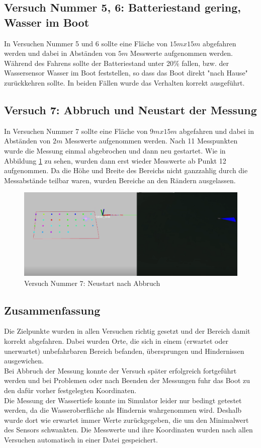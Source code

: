 \documentclass[11pt]{article}
\begin{document}
\subsection{Versuch Nummer 5, 6: Batteriestand gering, Wasser im Boot}
In Versuchen Nummer 5 und 6 sollte eine Fläche von $15mx15m$ abgefahren werden und dabei in Abständen von $5m$ Messwerte aufgenommen werden. Während des Fahrens sollte der Batteriestand unter 20\% fallen, bzw. der Wassersensor Wasser im Boot feststellen, so dass das Boot direkt "nach Hause" zurückkehren sollte. In beiden Fällen wurde das Verhalten korrekt ausgeführt.\\

\subsection{Versuch 7: Abbruch und Neustart der Messung}
In Versuchen Nummer 7 sollte eine Fläche von $9mx15m$ abgefahren und dabei in Abständen von $2m$ Messwerte aufgenommen werden. Nach 11 Messpunkten wurde die Messung einmal abgebrochen und dann neu gestartet. Wie in Abbildung \ref{Versuch7} zu sehen, wurden dann erst wieder Messwerte ab Punkt 12 aufgenommen. Da die Höhe und Breite des Bereichs nicht ganzzahlig durch die  Messabstände teilbar waren, wurden Bereiche an den Rändern ausgelassen.

\begin{figure}[H]
	\centering
	\includegraphics[width=0.8\linewidth]{versuch7.png}
	\caption{Versuch Nummer 7: Neustart nach Abbruch}
	\label{Versuch7}
\end{figure}

\subsection{Zusammenfassung}
Die Zielpunkte wurden in allen Versuchen richtig gesetzt und der Bereich damit korrekt abgefahren. Dabei wurden Orte, die sich in einem (erwartet oder unerwartet) unbefahrbaren Bereich befanden, übersprungen und Hindernissen ausgewichen.\\
Bei Abbruch der Messung konnte der Versuch später erfolgreich fortgeführt werden und bei Problemen oder nach Beenden der Messungen fuhr das Boot zu den dafür vorher festgelegten Koordinaten.\\
Die Messung der Wassertiefe konnte im Simulator leider nur bedingt getestet werden, da die Wasseroberfläche als Hindernis wahrgenommen wird. Deshalb wurde dort wie erwartet immer Werte zurückgegeben, die um den Minimalwert des Sensors schwankten. Die Messwerte und ihre Koordinaten wurden nach allen Versuchen automatisch in einer Datei gespeichert.
\end{document}
